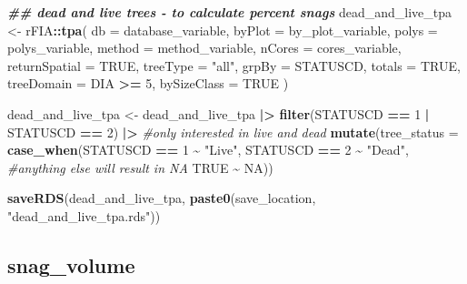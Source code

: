 \documentclass[
]{book}
\newenvironment{Shaded}{\begin{snugshade}}{\end{snugshade}}
\newcommand{\AttributeTok}[1]{\textcolor[rgb]{0.13,0.29,0.53}{#1}}
\newcommand{\CommentTok}[1]{\textcolor[rgb]{0.56,0.35,0.01}{\textit{#1}}}
\newcommand{\ConstantTok}[1]{\textcolor[rgb]{0.56,0.35,0.01}{#1}}
\newcommand{\DecValTok}[1]{\textcolor[rgb]{0.00,0.00,0.81}{#1}}
\newcommand{\DocumentationTok}[1]{\textcolor[rgb]{0.56,0.35,0.01}{\textbf{\textit{#1}}}}
\newcommand{\FunctionTok}[1]{\textcolor[rgb]{0.13,0.29,0.53}{\textbf{#1}}}
\newcommand{\NormalTok}[1]{#1}
\newcommand{\OtherTok}[1]{\textcolor[rgb]{0.56,0.35,0.01}{#1}}
\newcommand{\SpecialCharTok}[1]{\textcolor[rgb]{0.81,0.36,0.00}{\textbf{#1}}}
\newcommand{\StringTok}[1]{\textcolor[rgb]{0.31,0.60,0.02}{#1}}
\begin{document}
\begin{Shaded}
\begin{Highlighting}[]
\DocumentationTok{\#\# dead and live trees {-} to calculate percent snags}
\NormalTok{dead\_and\_live\_tpa }\OtherTok{\textless{}{-}}\NormalTok{ rFIA}\SpecialCharTok{::}\FunctionTok{tpa}\NormalTok{(}
  \AttributeTok{db =}\NormalTok{ database\_variable,}
  \AttributeTok{byPlot =}\NormalTok{ by\_plot\_variable,}
  \AttributeTok{polys =}\NormalTok{ polys\_variable,}
  \AttributeTok{method =}\NormalTok{ method\_variable,}
  \AttributeTok{nCores =}\NormalTok{ cores\_variable,}
  \AttributeTok{returnSpatial =} \ConstantTok{TRUE}\NormalTok{,}
  \AttributeTok{treeType =} \StringTok{"all"}\NormalTok{,}
  \AttributeTok{grpBy =}\NormalTok{ STATUSCD,}
  \AttributeTok{totals =} \ConstantTok{TRUE}\NormalTok{,}
  \AttributeTok{treeDomain =}\NormalTok{ DIA }\SpecialCharTok{\textgreater{}=} \DecValTok{5}\NormalTok{,}
  \AttributeTok{bySizeClass =} \ConstantTok{TRUE}
\NormalTok{)}

\NormalTok{dead\_and\_live\_tpa }\OtherTok{\textless{}{-}}\NormalTok{ dead\_and\_live\_tpa }\SpecialCharTok{|\textgreater{}}
  \FunctionTok{filter}\NormalTok{(STATUSCD }\SpecialCharTok{==} \DecValTok{1} \SpecialCharTok{|}\NormalTok{ STATUSCD }\SpecialCharTok{==} \DecValTok{2}\NormalTok{) }\SpecialCharTok{|\textgreater{}} \CommentTok{\#only interested in live and dead }
  \FunctionTok{mutate}\NormalTok{(}\AttributeTok{tree\_status =} \FunctionTok{case\_when}\NormalTok{(STATUSCD }\SpecialCharTok{==} \DecValTok{1} \SpecialCharTok{\textasciitilde{}} \StringTok{"Live"}\NormalTok{,}
\NormalTok{                                 STATUSCD }\SpecialCharTok{==} \DecValTok{2} \SpecialCharTok{\textasciitilde{}} \StringTok{"Dead"}\NormalTok{,}
                                 \CommentTok{\#anything else will result in NA}
                                 \ConstantTok{TRUE} \SpecialCharTok{\textasciitilde{}} \ConstantTok{NA}\NormalTok{)) }
  
\FunctionTok{saveRDS}\NormalTok{(dead\_and\_live\_tpa, }\FunctionTok{paste0}\NormalTok{(save\_location, }\StringTok{"dead\_and\_live\_tpa.rds"}\NormalTok{))}
\end{Highlighting}
\end{Shaded}

\hypertarget{snag_volume}{%
\subsection{snag\_volume}\label{snag_volume}}
\end{document}
